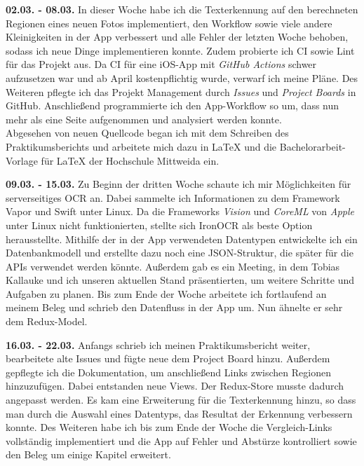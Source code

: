 \documentclass[notables, nomenclature, oneside, 150]{HSMW-Thesis}
\begin{document}
	\textbf{02.03. - 08.03.} 
	In dieser Woche habe ich die Texterkennung auf den berechneten Regionen eines neuen Fotos implementiert, den Workflow sowie viele andere Kleinigkeiten in der App verbessert und alle Fehler der letzten Woche behoben, sodass ich neue Dinge implementieren konnte. Zudem probierte ich CI sowie Lint für das Projekt aus. Da CI für eine iOS-App mit \textit{GitHub Actions} schwer aufzusetzen war und ab April kostenpflichtig wurde, verwarf ich meine Pläne. Des Weiteren pflegte ich das Projekt Management durch \textit{Issues} und \textit{Project Boards} in GitHub. Anschließend programmierte ich den App-Workflow so um, dass nun mehr als eine Seite aufgenommen und analysiert werden konnte. \\ 			
	Abgesehen von neuen Quellcode began ich mit dem Schreiben des Praktikumsberichts und arbeitete mich dazu in \LaTeX \xspace und die Bachelorarbeit-Vorlage für \LaTeX \xspace der Hochschule Mittweida ein.
	
	\textbf{09.03. - 15.03.} 
	Zu Beginn der dritten Woche schaute ich mir Möglichkeiten für serverseitiges OCR an. Dabei sammelte ich Informationen zu dem Framework Vapor und Swift unter Linux. Da die Frameworks \textit{Vision} und \textit{CoreML} von \textit{Apple} unter Linux nicht funktionierten, stellte sich IronOCR als beste Option herausstellte. Mithilfe der in der App verwendeten Datentypen entwickelte ich ein Datenbankmodell und erstellte dazu noch eine JSON-Struktur, die später für die APIs verwendet werden könnte. Außerdem gab es ein Meeting, in dem Tobias Kallauke und ich unseren aktuellen Stand präsentierten, um weitere Schritte und Aufgaben zu planen. Bis zum Ende der Woche arbeitete ich fortlaufend an meinem Beleg und schrieb den Datenfluss in der App um. Nun ähnelte er sehr dem Redux-Model.
	
	\textbf{16.03. - 22.03.} 
	Anfangs schrieb ich meinen Praktikumsbericht weiter, bearbeitete alte Issues und fügte neue dem Project Board hinzu. Außerdem gepflegte ich die Dokumentation, um anschließend Links zwischen Regionen hinzuzufügen. Dabei entstanden neue Views. Der Redux-Store musste dadurch angepasst werden. Es kam eine Erweiterung für die Texterkennung hinzu, so dass man durch die Auswahl eines Datentyps, das Resultat der Erkennung verbessern konnte. Des Weiteren habe ich bis zum Ende der Woche die Vergleich-Links vollständig implementiert und die App auf Fehler und Abstürze kontrolliert sowie den Beleg um einige Kapitel erweitert.
	
	
\end{document}
